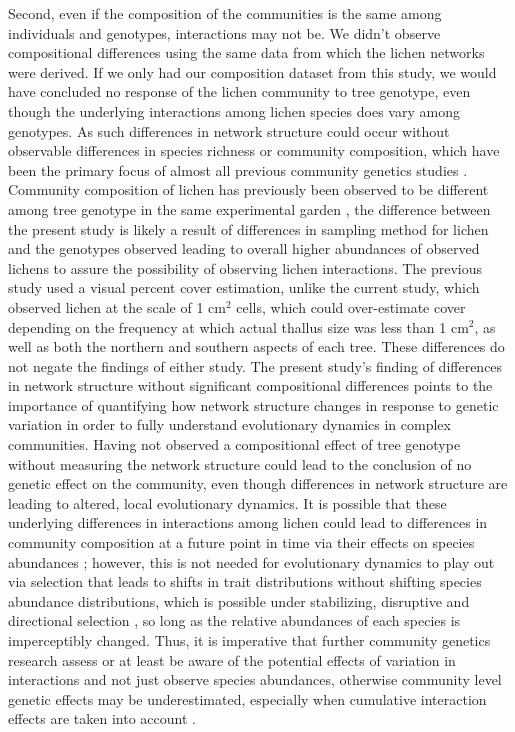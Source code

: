 \documentclass[fleqn,12pt]{olplainarticle}
\begin{document}
Second, even if the composition of the communities is the same among
individuals and genotypes, interactions may not be. We didn't observe
compositional differences using the same data from which the lichen
networks were derived. If we only had our composition dataset from
this study, we would have concluded no response of the lichen
community to tree genotype, even though the underlying interactions
among lichen species does vary among genotypes. As such differences in
network structure could occur without observable differences in
species richness or community composition, which have been the primary
focus of almost all previous community genetics studies
\citep{DesRoches2018TheVariation}. Community composition of lichen has
previously been observed to be different among tree genotype in the
same experimental garden \citep{Lamit2011, Lamit2015a}, the difference
between the present study is likely a result of differences in
sampling method for lichen and the genotypes observed leading to
overall higher abundances of observed lichens to assure the
possibility of observing lichen interactions. The previous study used
a visual percent cover estimation, unlike the current study, which
observed lichen at the scale of 1 cm$^2$ cells, which could
over-estimate cover depending on the frequency at which actual thallus
size was less than 1 cm$^2$, as well as both the northern and southern
aspects of each tree. These differences do not negate the findings of
either study. The present study's finding of differences in network
structure without significant compositional differences points to the
importance of quantifying how network structure changes in response to
genetic variation in order to fully understand evolutionary dynamics
in complex communities. Having not observed a compositional effect of
tree genotype without measuring the network structure could lead to
the conclusion of no genetic effect on the community, even though
differences in network structure are leading to altered, local
evolutionary dynamics. It is possible that these underlying
differences in interactions among lichen could lead to differences in
community composition at a future point in time via their effects on
species abundances \citep{Shuster2006COMMUNITYSTRUCTURE}; however,
this is not needed for evolutionary dynamics to play out via selection
that leads to shifts in trait distributions without shifting species
abundance distributions, which is possible under stabilizing,
disruptive and directional selection \citep{Conner2004ATextbook}, so
long as the relative abundances of each species is imperceptibly
changed. Thus, it is imperative that further community genetics
research assess or at least be aware of the potential effects of
variation in interactions and not just observe species abundances,
otherwise community level genetic effects may be underestimated,
especially when cumulative interaction effects are taken into account
\citep{Borrett2007FunctionalProliferation}.
\end{document}
